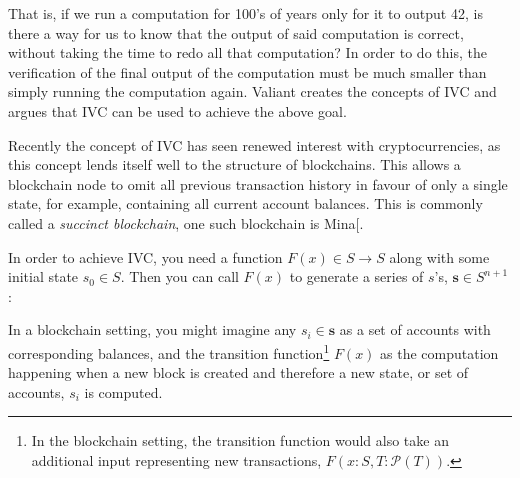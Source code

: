 \documentclass[
]{article}
\let\origfigure\figure
\let\endorigfigure\endfigure
\renewenvironment{figure}[1][2] {
    \expandafter\origfigure\expandafter[H]
} {
    \endorigfigure
}
\newcommand*\Pc{\mathcal{P}}
\renewcommand{\vec}[1]{ \boldsymbol{#1} }
\begin{document}
That is, if we run a computation for 100's of years only for it to
output 42, is there a way for us to know that the output of said
computation is correct, without taking the time to redo all that
computation? In order to do this, the verification of the final output
of the computation must be much smaller than simply running the
computation again. Valiant creates the concepts of IVC and argues that
IVC can be used to achieve the above goal.

Recently the concept of IVC has seen renewed interest with
cryptocurrencies, as this concept lends itself well to the structure of
blockchains. This allows a blockchain node to omit all previous
transaction history in favour of only a single state, for example,
containing all current account balances. This is commonly called a
\emph{succinct blockchain}, one such blockchain is
Mina{[}\citeproc{ref-mina}{2025}{]}.

In order to achieve IVC, you need a function \(F(x) \in S \to S\) along
with some initial state \(s_0 \in S\). Then you can call \(F(x)\) to
generate a series of \(s\)'s, \(\vec{s} \in S^{n+1}\):

\begin{figure}[!H]
\centering
{}
\caption{
  A visualization of the relationship between $F(x)$ and $\vec{s}$ in a non-IVC setting.
}
\end{figure}

In a blockchain setting, you might imagine any \(s_i \in \vec{s}\) as a
set of accounts with corresponding balances, and the transition
function\footnote{In the blockchain setting, the transition function
  would also take an additional input representing new transactions,
  \(F(x: S, T: \Pc(T))\).} \(F(x)\) as the computation happening when a
new block is created and therefore a new state, or set of accounts,
\(s_i\) is computed.
\end{document}
